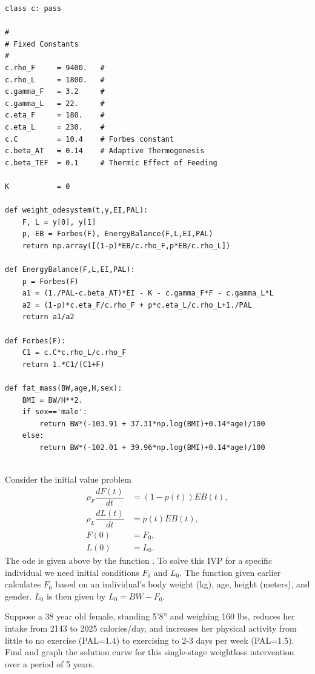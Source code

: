 \begin{lstlisting}
class c: pass

# 
# Fixed Constants
# 
c.rho_F		= 9400.   # 
c.rho_L		= 1800.   #
c.gamma_F	= 3.2     # 
c.gamma_L	= 22.     # 
c.eta_F		= 180.    # 
c.eta_L		= 230.    # 
c.C			= 10.4    # Forbes constant
c.beta_AT	= 0.14    # Adaptive Thermogenesis
c.beta_TEF	= 0.1     # Thermic Effect of Feeding

K 			= 0

def weight_odesystem(t,y,EI,PAL):
	F, L = y[0], y[1]
	p, EB = Forbes(F), EnergyBalance(F,L,EI,PAL)
	return np.array([(1-p)*EB/c.rho_F,p*EB/c.rho_L]) 

def EnergyBalance(F,L,EI,PAL):
	p = Forbes(F)
	a1 = (1./PAL-c.beta_AT)*EI - K - c.gamma_F*F - c.gamma_L*L
	a2 = (1-p)*c.eta_F/c.rho_F + p*c.eta_L/c.rho_L+1./PAL
	return a1/a2

def Forbes(F):
	C1 = c.C*c.rho_L/c.rho_F
	return 1.*C1/(C1+F)

def fat_mass(BW,age,H,sex):
	BMI = BW/H**2.
	if sex=='male': 
		return BW*(-103.91 + 37.31*np.log(BMI)+0.14*age)/100
	else: 
		return BW*(-102.01 + 39.96*np.log(BMI)+0.14*age)/100
	
\end{lstlisting}



\begin{problem}
Consider the initial value problem
\begin{subequations}
\label{weight_prob1}
\begin{align*}
\rho_F \dfrac{dF(t)}{dt} &= (1-p(t)) EB(t),\\ %
\rho_L \dfrac{dL(t)}{dt} &= p(t) EB(t),\\%
F(0) &= F_0, \\
L(0) &= L_0.
\end{align*}
\end{subequations}
The ode is given above by the function . To solve this IVP for
 a specific individual we need initial conditions $F_0$ and $L_0.$ The function
  given earlier calculates $F_0$ based on an individual's 
body weight (kg), age, height (meters), and gender. $L_0$ is then given by 
$L_0 = BW - F_0$.

Suppose a 38 year old female, standing 5'8'' and weighing 160 lbs, reduces her intake from 
2143 to 2025 calories/day, and increases her physical activity from little to no exercise
 (PAL=1.4) to exercising to 2-3 days per week (PAL=1.5).  
Find and graph the solution curve for this single-stage weightloss intervention over a
 period of 5 years.

\end{problem}

